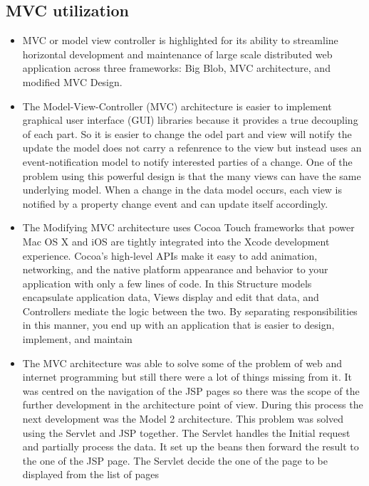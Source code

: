 \documentclass[conference]{IEEEtran}
\begin{document}
\subsection{MVC utilization}
\begin{itemize}
\item MVC or model view controller is highlighted for its ability to streamline horizontal development and maintenance of large scale distributed web application across three frameworks: Big Blob, MVC architecture, and modified MVC Design.
\item The Model-View-Controller (MVC) architecture is easier to implement graphical user interface (GUI) libraries because it provides a true decoupling of each part. So it is easier to change the odel part and view will notify the update the model does not carry a refenrence to the view but instead uses an event-notification model to notify interested parties of a change. One of the problem using this powerful design is that the many views can have the same underlying model. When a change in the data model occurs, each view is notified by a property change event and can update itself accordingly.
\item The Modifying MVC architecture uses Cocoa Touch
frameworks that power Mac OS X and iOS are tightly integrated
into the Xcode development experience. Cocoa’s high-level
APIs make it easy to add animation, networking, and the native
platform appearance and behavior to your application with only
a few lines of code. In this Structure models encapsulate
application data, Views display and edit that data, and
Controllers mediate the logic between the two. By separating
responsibilities in this manner, you end up with an application
that is easier to design, implement, and maintain
\item The MVC architecture was able to solve some of the problem of
web and internet programming but still there were a lot of things
missing from it. It was centred on the navigation of the JSP
pages so there was the scope of the further development in the
architecture point of view. During this process the next
development was the Model 2 architecture. This problem was
solved using the Servlet and JSP together. The Servlet handles
the Initial request and partially process the data. It set up the
beans then forward the result to the one of the JSP page. The
Servlet decide the one of the page to be displayed from the list of
pages



\end{itemize}
\end{document}
